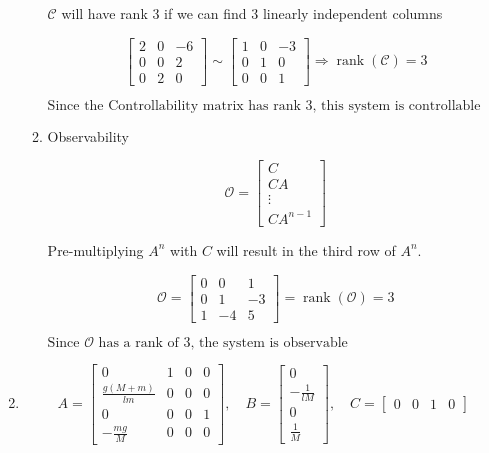 \documentclass{article}
\begin{document}
\begin{enumerate}[label=\alph*)]
\begin{enumerate}[label=\roman*)]
        $\mathcal{C}$ will have rank 3 if we can find 3 linearly independent columns

        \[
        \begin{bmatrix}
            2 & 0 & -6 \\
            0 & 0 & 2 \\
            0 & 2 & 0
        \end{bmatrix}
        \sim
        \begin{bmatrix}
            1 & 0 & -3 \\
            0 & 1 & 0 \\
            0 & 0 & 1
        \end{bmatrix}
        \Rightarrow \operatorname{rank}(\mathcal{C}) = 3
        \]

    $\boxed{\text{Since the Controllability matrix has rank 3, this system is controllable}}$

    \item Observability
     
    \[
    \mathcal{O} = 
    \begin{bmatrix}
        C \\
        CA \\
        \vdots \\
        CA^{n-1}
    \end{bmatrix}
    \]

    Pre-multiplying $A^n$ with $C$ will result in the third row of $A^n$.

    \[
    \mathcal{O} = 
    \begin{bmatrix}
        0 & 0 & 1 \\
        0 & 1 & -3 \\
        1 & -4 & 5
    \end{bmatrix}
    = \operatorname{rank}(\mathcal{O}) = 3
    \]

    $\boxed{\text{Since $\mathcal{O}$ has a rank of 3, the system is observable}}$

    \end{enumerate}

    \item

    \[
    A = 
    \begin{bmatrix}
        0 & 1 & 0 & 0 \\
        \frac{g(M+m)}{lm} & 0 & 0 & 0 \\
        0 & 0 & 0 & 1 \\
        -\frac{mg}{M} & 0 & 0 & 0 
    \end{bmatrix}
    , \quad B = 
    \begin{bmatrix}
        0 \\
        -\frac{1}{lM} \\
        0 \\
        \frac{1}{M}
    \end{bmatrix}
    , \quad C = 
    \begin{bmatrix}
        0 & 0 & 1 & 0
    \end{bmatrix}
    \]


\end{enumerate}
\end{document}

